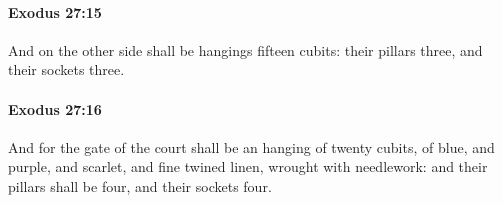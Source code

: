 		\paragraph{Exodus 27:15} %
			\label{EXODUS-27-15}

			And on the other side shall be hangings fifteen cubits: their pillars three, and their sockets three.


		\paragraph{Exodus 27:16} %
			\label{EXODUS-27-16}

			And for the gate of the court shall be an hanging of twenty cubits, of blue, and purple, and scarlet, and fine twined linen, wrought with needlework: and their pillars shall be four, and their sockets four.


